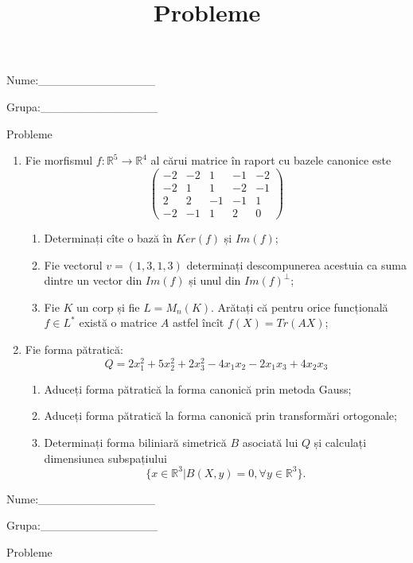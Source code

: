 \documentclass{article}
\title{Probleme}
\author{ }
\date{ }
\begin{document}
\begin{flushright}
Nume:\_\_\_\_\_\_\_\_\_\_\_\_\_\_
 
 
Grupa:\_\_\_\_\_\_\_\_\_\_\_\_\_\_
\end{flushright}
\begin{center}
\vspace{2cm}
{\Large Probleme}
\vspace{2cm}
\end{center}
\begin{enumerate}
 \item Fie morfismul $f:\mathbb{R}^5 \to \mathbb{R}^4$ al cărui matrice în raport cu bazele canonice este
$$\begin{pmatrix}
-2&-2&1&-1&-2\\
-2&1&1&-2&-1\\
2&2&-1&-1&1\\
-2&-1&1&2&0
\end{pmatrix}$$

\begin{enumerate}
\item Determinați cîte o bază în $Ker(f)$ și $Im(f)$;
\item Fie vectorul $v=(1,3,1,3)$ determinați descompunerea acestuia ca suma dintre un vector din $Im(f)$ și unul din $Im(f)^\perp$;
\item Fie $K$ un corp și fie $L=M_n(K)$. Arătați că pentru orice funcțională $f \in L^*$ există o matrice $A$ astfel încît $f(X)=Tr(AX)$;
\end{enumerate}
\item Fie forma pătratică:
$$Q= 2x_1^2+5x_2^2+2x_3^2-4x_1x_2-2x_1x_3+4x_2x_3$$

\begin{enumerate}
\item Aduceți forma pătratică la forma canonică prin metoda Gauss;
\item Aduceți forma pătratică la forma canonică prin transformări ortogonale;
\item Determinați forma biliniară simetrică $B$ asociată lui $Q$ și calculați dimensiunea subspațiului
$$\{x \in \mathbb{R}^3 | B(X,y)=0,\forall y \in \mathbb{R}^3\}.$$

\end{enumerate}
\end{enumerate}
\newpage
\begin{flushright}
Nume:\_\_\_\_\_\_\_\_\_\_\_\_\_\_
 
 
Grupa:\_\_\_\_\_\_\_\_\_\_\_\_\_\_
\end{flushright}
\begin{center}
\vspace{2cm}
{\Large Probleme}
\vspace{2cm}
\end{center}
\end{document}
